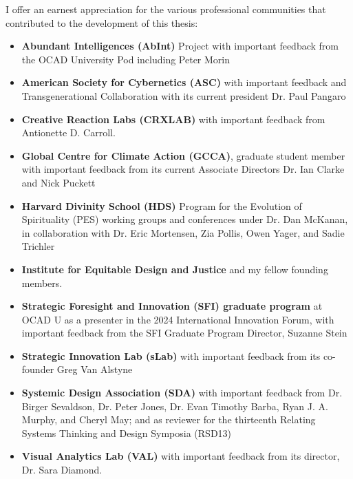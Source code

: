 I offer an earnest appreciation for the various professional communities that contributed to the development of this thesis:
\begin{itemize}
\item[]  \textbf{Abundant Intelligences (AbInt)} Project with important feedback from the OCAD University Pod including Peter Morin

\item[] \textbf{American Society for Cybernetics (ASC)} with important feedback and Transgenerational Collaboration with its current president Dr. Paul Pangaro

\item[] \textbf{Creative Reaction Labs (CRXLAB)} with important feedback from Antionette D. Carroll.

\item[] \textbf{Global Centre for Climate Action (GCCA)}, graduate student member with important feedback from its current Associate Directors Dr. Ian Clarke and Nick Puckett

\item[] \textbf{Harvard Divinity School (HDS)} Program for the Evolution of Spirituality (PES) working groups and conferences under Dr. Dan McKanan, in collaboration with Dr. Eric Mortensen, Zia Pollis, Owen Yager, and Sadie Trichler

\item[] \textbf{Institute for Equitable Design and Justice} and my fellow founding members.

\item[] \textbf{Strategic Foresight and Innovation (SFI) graduate program} at OCAD U as a presenter in the 2024 International Innovation Forum, with important feedback from the SFI Graduate Program Director, Suzanne Stein

\item[] \textbf{Strategic Innovation Lab (sLab)} with important feedback from its co-founder Greg Van Alstyne

\item[] \textbf{Systemic Design Association (SDA)} with important feedback from Dr. Birger Sevaldson, Dr. Peter Jones, Dr. Evan Timothy Barba, Ryan J. A. Murphy, and Cheryl May; and as reviewer for the thirteenth Relating Systems Thinking and Design Symposia (RSD13)

\item[] \textbf{Visual Analytics Lab (VAL)} with important feedback from its director, Dr. Sara Diamond.  
\end{itemize}